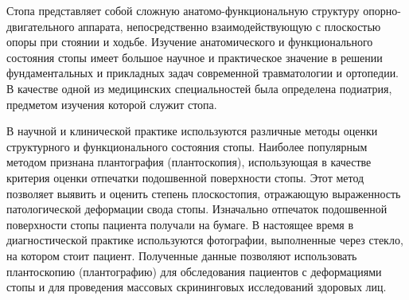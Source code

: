 \documentclass[coursework]{SCWorks}
\begin{document}

\date{2026}

\maketitle

\secNumbering

\tableofcontents




\intro
Стопа представляет собой сложную анатомо-функциональную структуру опорно-двигательного аппарата, непосредственно взаимодействующую с плоскостью опоры при стоянии и ходьбе. Изучение анатомического и функционального состояния стопы имеет большое научное и практическое значение в решении фундаментальных и прикладных задач современной травматологии и ортопедии. В качестве одной из медицинских специальностей была определена подиатрия, предметом изучения которой служит стопа.

В научной и клинической практике используются различные методы оценки структурного и функционального состояния стопы. Наиболее популярным методом признана плантография (плантоскопия), использующая в качестве критерия оценки отпечатки подошвенной поверхности стопы. Этот метод позволяет выявить и оценить степень плоскостопия, отражающую выраженность патологической деформации свода стопы. Изначально отпечаток подошвенной поверхности стопы пациента получали на бумаге. В настоящее время в диагностической практике используются фотографии, выполненные через стекло, на котором стоит пациент. Полученные данные позволяют использовать плантоскопию (плантографию) для обследования пациентов с деформациями стопы и для проведения массовых скрининговых исследований здоровых лиц.
\end{document}
